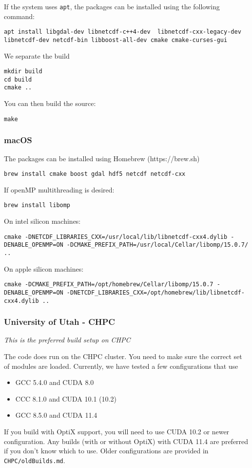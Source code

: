 If the system uses \verb|apt|, the packages can be installed using the following command:
\begin{verbatim}
apt install libgdal-dev libnetcdf-c++4-dev  libnetcdf-cxx-legacy-dev libnetcdf-dev netcdf-bin libboost-all-dev cmake cmake-curses-gui
\end{verbatim}


We separate the build
\begin{verbatim}
mkdir build
cd build
cmake ..
\end{verbatim}
You can then build the source:
\begin{verbatim}
make
\end{verbatim}

\subsubsection{macOS}

The packages can be installed using Homebrew (https://brew.sh)

\begin{verbatim}
brew install cmake boost gdal hdf5 netcdf netcdf-cxx
\end{verbatim}

If openMP multithreading is desired:
\begin{verbatim}
brew install libomp
\end{verbatim}

On intel silicon machines:
\begin{verbatim}
cmake -DNETCDF_LIBRARIES_CXX=/usr/local/lib/libnetcdf-cxx4.dylib -DENABLE_OPENMP=ON -DCMAKE_PREFIX_PATH=/usr/local/Cellar/libomp/15.0.7/ ..
\end{verbatim}

On apple silicon machines:
\begin{verbatim}
cmake -DCMAKE_PREFIX_PATH=/opt/homebrew/Cellar/libomp/15.0.7 -DENABLE_OPENMP=ON -DNETCDF_LIBRARIES_CXX=/opt/homebrew/lib/libnetcdf-cxx4.dylib ..
\end{verbatim}

\subsubsection{University of Utah - CHPC}

\textit{This is the preferred build setup on CHPC}

The code does run on the CHPC cluster. You need to make sure the correct set of modules are loaded.  Currently, we have tested a few configurations that use
\begin{itemize}
\item GCC 5.4.0 and CUDA 8.0
\item CCC 8.1.0 and CUDA 10.1 (10.2)
\item GCC 8.5.0 and CUDA 11.4
\end{itemize}
If you build with OptiX support, you will need to use CUDA 10.2 or newer configuration. Any builds (with or without OptiX) with CUDA 11.4 are preferred if you don't know which to use. Older configurations are provided in \verb|CHPC/oldBuilds.md|.

